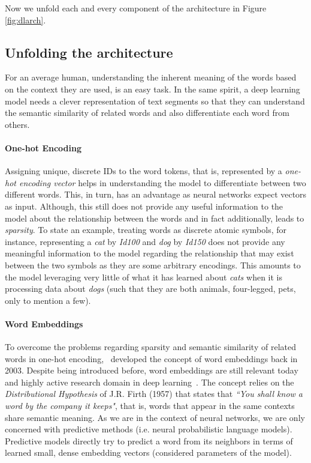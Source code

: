 Now we unfold each and every component of the architecture in Figure \ref{fig:dlarch}. 

\subsection{Unfolding the architecture}\label{section:architecture}

For an average human, understanding the inherent meaning of the words based on the context they are used, is an easy task. In the same spirit, a deep learning model needs a clever representation of text segments so that they can understand the semantic similarity of related words and also differentiate each word from others. 


\paragraph{One-hot Encoding} Assigning unique, discrete IDs to the word tokens, that is, represented by a \emph{one-hot encoding vector} helps in understanding the model to differentiate between two different words. This, in turn, has an advantage as neural networks expect vectors as input. Although, this still does not provide any useful information to the model about the relationship between the words and in fact additionally, leads to \emph{sparsity}. 
To state an example, treating words as discrete atomic symbols, for instance, representing a \emph{cat} by \emph{Id100} and \emph{dog} by \emph{Id150} does not provide any meaningful information to the model regarding the relationship that may exist between the two symbols as they are some arbitrary encodings. This amounts to the model leveraging very little of what it has learned about \emph{cats} when it is processing data about \emph{dogs} (such that they are both animals, four-legged, pets, only to mention a few).

\paragraph{Word Embeddings} To overcome the problems regarding sparsity and semantic similarity of related words in one-hot encoding,~\cite{bengio2003neural} developed the concept of word embeddings back in 2003. Despite being introduced before, word embeddings are still relevant today and highly active research domain in deep learning~\cite{bojanowski2017enriching, joulin2017bag, joulin2016fasttext, Peters:2018}. The concept relies on the \emph{Distributional Hypothesis} of J.R. Firth (1957) that states that \emph{``You shall know a word by the company it keeps"}, that is, words that appear in the same contexts share semantic meaning. As we are in the context of neural networks, we are only concerned with predictive methods (i.e. neural probabilistic language models). Predictive models directly try to predict a word from its neighbors in terms of learned small, dense embedding vectors (considered parameters of the model).



